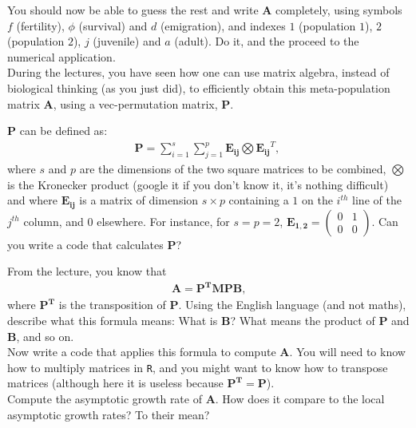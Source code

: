 \documentclass{article}\usepackage[]{graphicx}\usepackage[]{color}
\begin{document}
You should now be able to guess the rest and write $\boldsymbol{A}$ completely, using symbols $f$ (fertility), $\phi$ (survival) and $d$ (emigration), and indexes $1$ (population $1$), $2$ (population $2$), $j$ (juvenile) and $a$ (adult).
Do it, and the proceed to the numerical application.\\


During the lectures, you have seen how one can use matrix algebra, instead of biological thinking (as you just did), to efficiently obtain this meta-population matrix $\boldsymbol{A}$, using a vec-permutation matrix, $\boldsymbol{P}$.

$\boldsymbol{P}$ can be defined as:
\begin{align*}
\boldsymbol{P} = \sum\limits_{i=1}^s  \sum\limits_{j=1}^p \boldsymbol{E_{ij}} \bigotimes \boldsymbol{E_{ij}}^T\text{, }
\end{align*}
where $s$ and $p$ are the dimensions of the two square matrices to be combined, $\bigotimes$ is the Kronecker product (google it if you don't know it, it's nothing difficult) and where $\boldsymbol{E_{ij}}$ is a matrix of dimension $s\times p$ containing a $1$ on the $i^{th}$ line of the $j^{th}$ column, and $0$ elsewhere. 
For instance, for $s=p=2$, $\boldsymbol{E_{1,2}} = \begin{pmatrix} 0 & 1 \\ 0 & 0 \end{pmatrix}$.
Can you write a code that calculates $\boldsymbol{P}$?



From the lecture, you know that
\begin{align*}
\boldsymbol{A} = \boldsymbol{P^T}\boldsymbol{M}\boldsymbol{P}\boldsymbol{B} \text{,}
\end{align*}
where $\boldsymbol{P^T}$ is the transposition of $\boldsymbol{P}$. 
Using the English language (and not maths), describe what this formula means: What is $\boldsymbol{B}$? What means the product of $\boldsymbol{P}$ and $\boldsymbol{B}$, and so on.\\

Now write a code that applies this formula to compute $\boldsymbol{A}$. You will need to know how to multiply matrices in \texttt{R}, and you might want to know how to transpose matrices (although here it is useless because $\boldsymbol{P^T}=\boldsymbol{P}$).\\

Compute the asymptotic growth rate of $\boldsymbol{A}$. How does it compare to the local asymptotic growth rates? To their mean?\\
\end{document}
